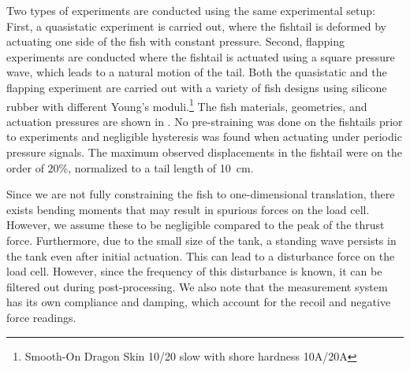 Two types of experiments are conducted using the same experimental setup: First, a quasistatic experiment is carried out, where the fishtail is deformed by actuating one side of the fish with constant pressure. Second, flapping experiments are conducted where the fishtail is actuated using a square pressure wave, which leads to a natural motion of the tail. Both the quasistatic and the flapping experiment are carried out with a variety of fish designs using silicone rubber with different Young's moduli.\footnote{Smooth-On Dragon Skin 10/20 slow with shore hardness 10A/20A} The fish materials, geometries, and actuation pressures are shown in . No pre-straining was done on the fishtails prior to experiments and negligible hysteresis was found when actuating under periodic pressure signals. The maximum observed displacements in the fishtail were on the order of $20\%$, normalized to a tail length of \SI{10}{cm}.

Since we are not fully constraining the fish to one-dimensional translation, there exists bending moments that may result in spurious forces on the load cell. However, we assume these to be negligible compared to the peak of the thrust force. Furthermore, due to the small size of the tank, a standing wave persists in the tank even after initial actuation. This can lead to a disturbance force on the load cell. However, since the frequency of this disturbance is known, it can be filtered out during post-processing. We also note that the measurement system has its own compliance and damping, which account for the recoil and negative force readings.
